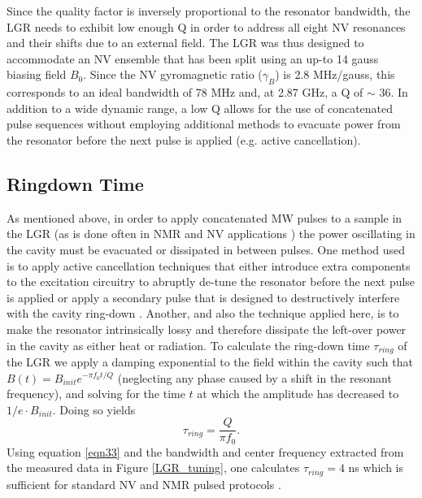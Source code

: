 Since the quality factor is inversely proportional to the resonator bandwidth, the LGR needs to exhibit low enough Q in order to address all eight NV resonances and their shifts due to an external field. The LGR was thus designed to accommodate an NV ensemble that has been split using an up-to 14 gauss biasing field $B_0$. Since the NV gyromagnetic ratio ($\gamma_B$) is 2.8 MHz/gauss, this corresponds to an ideal bandwidth of 78 MHz and, at 2.87 GHz, a Q of $\sim$ 36. In addition to a wide dynamic range, a low Q allows for the use of concatenated pulse sequences without employing additional methods to evacuate power from the resonator before the next pulse is applied (e.g. active cancellation). 

\subsection{Ringdown Time}\label{ringdown}

As mentioned above, in order to apply concatenated MW pulses to a sample in the LGR (as is done often in NMR and NV applications \cite{wang2012comparison, carr1954effects}) the power oscillating in the cavity must be evacuated or dissipated in between pulses. One method used is to apply active cancellation techniques that either introduce extra components to the excitation circuitry to abruptly de-tune the resonator before the next pulse is applied  \cite{peshkovsky2005rf} or apply a secondary pulse that is designed to destructively interfere with the cavity ring-down \cite{Franck2015Active}. Another, and also the technique applied here, is to make the resonator intrinsically lossy and therefore dissipate the left-over power in the cavity as either heat or radiation. To calculate the ring-down time $\tau_{ring}$ of the LGR we apply a damping exponential to the field within the cavity such that $B(t) = B_{init}e^{-\pi f_0t/Q}$ (neglecting any phase caused by a shift in the resonant frequency), and solving for the time $t$ at which the amplitude has decreased to $1/e \cdot B_{init}$. Doing so yields
\begin{equation}\label{eqn33}
\tau_{ring} = \frac{Q}{\pi f_0}.
\end{equation} 
Using equation \ref{eqn33} and the bandwidth and center frequency extracted from the measured data in Figure \ref{LGR_tuning}, one calculates $\tau_{ring} = 4$ ns which is sufficient for standard NV and NMR pulsed protocols \cite{Smeltzer2009Robust,Jelezko2004Observation,Steiner2010Universal}.

